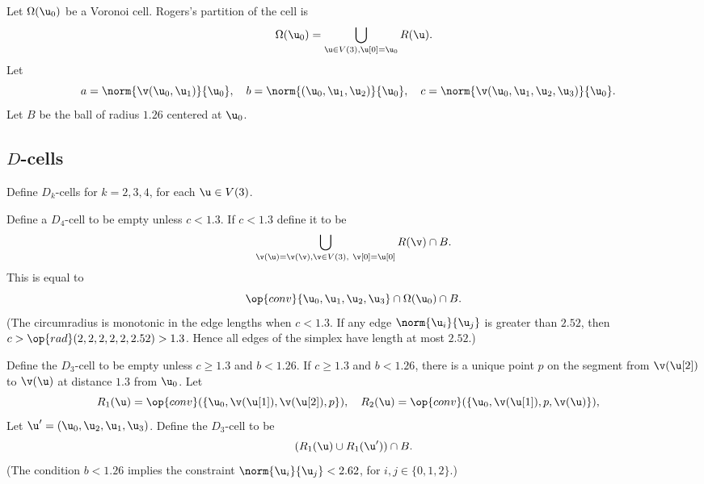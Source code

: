 Let $\Omega( \u_0)$ be a Voronoi cell.  Rogers's partition of the cell
is
\begin{displaymath}
\Omega( \u_0) = \bigcup_{ \u\in  V(3), \u[0]= \u_0 } R( \u).
\end{displaymath}
Let 
\begin{displaymath}
a = \norm{ \v( \u_0, \u_1)}{   \u_0},\quad
b = \norm{( \u_0, \u_1, \u_2)}{  \u_0},\quad
c = \norm{ \v( \u_0, \u_1, \u_2, \u_3)}{   \u_0}.\quad
\end{displaymath}
Let $B$ be the ball of radius $1.26$ centered at $ \u_0$.
%
%


\subsection{$D$-cells}

Define $D_k$-cells for $k=2,3,4$, for each $ \u\in V(3)$.
%
%

 Define a $D_4$-cell to be empty unless $c<1.3$.  If
$c<1.3$ define it to be
\begin{displaymath}
\bigcup_{\v( \u)=\v(\v),  \v\in  V(3),\ \v[0]= \u[0]}  R(\v)\cap B.
\end{displaymath}
This is equal to
\begin{displaymath}
\op{conv}\{ \u_0, \u_1, \u_2, \u_3\} \cap \Omega( \u_0)\cap B.
\end{displaymath}
(The circumradius is monotonic in the edge lengths when $c<1.3$.  If
any edge $\norm{ \u_i}{ \u_j}$ is greater than $2.52$, then $c >
\op{rad}(2,2,2,2,2,2.52) > 1.3$.  Hence all edges of the simplex have
length at most $2.52$.)  %

 Define the $D_3$-cell to be empty unless $c\ge 1.3$ and
$b< 1.26$.  If $c \ge 1.3$ and $b< 1.26$, there is a unique point $p$
on the segment from $\v( \u[2])$ to $\v( \u)$ at distance $1.3$ from $
\u_0$.  Let
\begin{displaymath}
R_1( \u) = \op{conv}(\{ \u_0,\v( \u[1]),\v( \u[2]),p\} ),\quad
R_2( \u) = \op{conv}(\{ \u_0,\v( \u[1]),p,\v( \u)\} ),\quad
\end{displaymath}
Let $ \u' = ( \u_0, \u_2, \u_1, \u_3)$.
Define the $D_3$-cell to be
\begin{displaymath}
(R_1( \u) \cup R_1( \u'))\cap B.
\end{displaymath}
(The condition $b< 1.26$ implies the constraint $\norm{ \u_i}{ \u_j}<
2.62$, for $i,j\in\{0,1,2\}$.)

